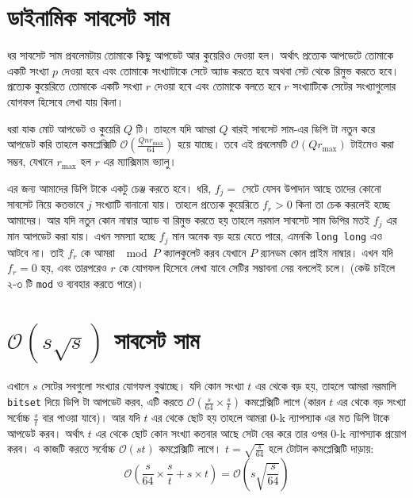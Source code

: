 \section{ডাইনামিক সাবসেট সাম}
ধর সাবসেট সাম প্রবলেমটায় তোমাকে কিছু আপডেট আর কুয়েরিও দেওয়া হল। অর্থাৎ প্রত্যেক আপডেটে তোমাকে একটি সংখ্যা \(p\) দেওয়া হবে এবং তোমাকে সংখ্যাটাকে সেটে  অ্যাড করতে হবে অথবা সেট থেকে রিমুভ করতে হবে। প্রত্যেক কুয়েরিতে তোমাকে একটি সংখ্যা \(r\) দেওয়া হবে এবং তোমাকে বলতে হবে \(r\) সংখ্যাটিকে সেটের সংখ্যাগুলোর যোগফল হিসেবে লেখা যায় কিনা। 

ধরা যাক মোট আপডেট ও কুয়েরি \(Q\) টি। তাহলে যদি আমরা \(Q\) বারই সাবসেট সাম-এর ডিপি টা নতুন করে আপডেট করি তাহলে কমপ্লেক্সিটি \(\mathcal{O}(\frac{Qnr_{\max}}{64})\) হয়ে যাচ্ছে। তবে এই প্রবলেমটি \(\mathcal{O}(Qr_{\max})\) টাইমেও করা সম্ভব, যেখানে \(r_{\max}\) হল \(r\) এর ম্যাক্সিমাম ভ্যালু।     

এর জন্য আমাদের ডিপি টাকে একটু চেঞ্জ করতে হবে। ধরি, \(f_j = \) সেটে যেসব উপাদান আছে তাদের কোনো সাবসেট নিয়ে কতভাবে \(j\) সংখ্যাটি বানানো যায়। তাহলে প্রত্যেক কুয়েরিতে \(f_r > 0\) কিনা তা চেক করলেই হচ্ছে আমাদের।  আর যদি নতুন কোন নাম্বার অ্যাড বা রিমুভ করতে হয় তাহলে নরমাল সাবসেট সাম ডিপির মতই \(f_j\) এর মান আপডেট করা যায়। এখন সমস্যা হচ্ছে \(f_j\) মান অনেক বড় হয়ে যেতে পারে, এমনকি \texttt{long long} এও আটবে না। তাই \(f_r\) কে আমরা \(\mod P\) ক্যালকুলেট করব যেখানে \(P\) র‍্যানডম কোন প্রাইম নাম্বার। এখন যদি \(f_r = 0\) হয়, এবং তারপরেও \(r\) কে যোগফল হিসেবে লেখা যাবে সেটির সম্ভাবনা নেয় বললেই চলে। (কেউ চাইলে ২-৩ টি \texttt{mod} ও ব্যবহার করতে পারে)।

\section{\texorpdfstring{$\mathcal{O}\left(s \sqrt{s} \right)$}{O(s sqrt(s))} সাবসেট সাম}
এখানে \(s\) সেটের সবগুলো সংখ্যার যোগফল বুঝাচ্ছে।  যদি কোন সংখ্যা \(t\) এর থেকে বড় হয়, তাহলে আমরা নরমালি \texttt{bitset} দিয়ে ডিপি টা আপডেট করব, এটি করতে \(\mathcal{O} \left ( \frac{s}{64} \times \frac{s}{t} \right )\) কমপ্লেক্সিটি লাগে (কারন \(t\) এর থেকে বড় সংখ্যা সর্বোচ্চ \(\frac{s}{t}\) বার পাওয়া যাবে)। আর যদি \(t\) এর থেকে ছোট হয় তাহলে আমরা 0-k ন্যাপস্যাক এর মত ডিপি টাকে আপডেট করব। অর্থাৎ \(t\) এর থেকে ছোট কোন সংখ্যা কতবার আছে সেটা বের করে তার ওপর 0-k ন্যাপস্যাক প্রয়োগ করব। এ কাজটি করতে সর্বোচ্চ \(\mathcal{O}(st)\) কমপ্লেক্সিটি লাগে।  \(t = \sqrt{\frac{s}{64}}\) হলে টোটাল কমপ্লেক্সিটি দাড়ায়: 
\[\mathcal{O} \left ( \frac{s}{64} \times \frac{s}{t} + s \times t \right ) = \mathcal{O} \left ( s \sqrt{ \frac{s}{64} } \right )\]


